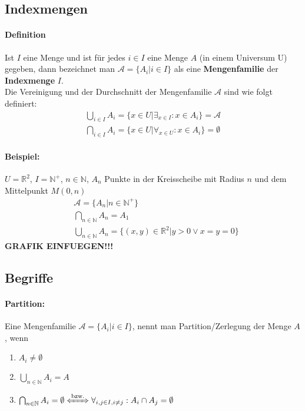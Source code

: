 \documentclass[10pt,a4paper]{article}
\begin{document}
\subsection{Indexmengen}
\paragraph{Definition}Ist $I$ eine Menge und ist für jedes $i\in I$ eine Menge $A$ (in einem Universum U) gegeben, dann bezeichnet man
$\mathcal{A}=\{A_i|i\in I\}$ als eine \textbf{Mengenfamilie} der \textbf{Indexmenge} $I$.\\
Die Vereinigung und der Durchschnitt der Mengenfamilie $\mathcal{A}$ sind wie folgt definiert:
\begin{align*}
\bigcup_{i\in I} A_i = \{x\in U | \exists_{x\in I}: x\in A_i\}=\mathcal{A} \\
\bigcap_{i\in I} A_i = \{x\in U | \forall_{x\in U}: x\in A_i\} =\emptyset
\end{align*}

\paragraph{Beispiel:} $U=\mathbb{R}^2$, $I=\mathbb{N}^+$, $n\in\mathbb{N}$, $A_n$ Punkte in der Kreisscheibe mit Radius $n$ und dem Mittelpunkt $M(0,n)$
\begin{align*}
&\mathcal{A}=\{A_n|n\in \mathbb{N}^+\} \\
&\bigcap_{n\in\mathbb{N}}A_n=A_1 \\
&\bigcup_{n\in\mathbb{N}}A_n=\{ (x,y)\in\mathbb{R}^2 | y>0 \lor x=y=0\}
\end{align*}
\textbf{GRAFIK EINFUEGEN!!!}
\subsection{Begriffe}
\paragraph{Partition:}Eine Mengenfamilie $\mathcal{A}=\{A_i | i\in I\}$, nennt man Partition/Zerlegung der Menge $A$, wenn
\begin{enumerate}
\item $A_i \neq \emptyset$
\item $\bigcup_{n\in\mathbb{N}}A_i=A$
\item $\bigcap_{n\in\mathbb{N}}A_i=\emptyset \xLeftrightarrow{\text{bzw.}} \forall_{i,j\in I,i\neq j}:A_i\cap A_j=\emptyset$
\end{enumerate}
\end{document}
